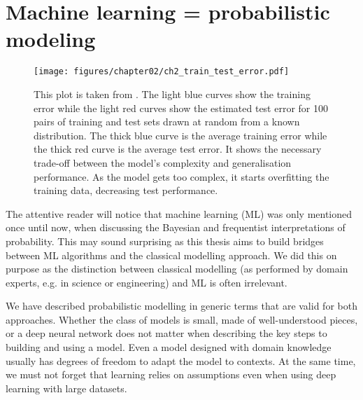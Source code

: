 \section{Machine learning = probabilistic modeling}
\begin{figure}
  \centering
  \texttt{[image: figures/chapter02/ch2\_train\_test\_error.pdf]}
  \caption{This plot is taken from \citet{louppe2014understanding}.
  The light blue curves show the training error while the
  light red curves show the estimated test error for 100
  pairs of training and test sets drawn at random
  from a known distribution. The thick blue curve is the average
  training error while the thick red curve is the average test error.
  It shows the necessary trade-off between the model's complexity and generalisation performance. As the model gets too complex, it starts overfitting the training data, decreasing test performance.}
  \label{fig:ch02:learning_curves}
\end{figure}
The attentive reader will notice that machine learning (ML) was only mentioned once until now, when discussing the Bayesian and frequentist interpretations of probability.
This may sound surprising as this thesis aims to build bridges between ML algorithms and the classical modelling approach. We did this on purpose as the distinction between classical modelling (as performed by domain experts, e.g. in science or engineering) and ML is often irrelevant.

We have described probabilistic modelling in generic terms that are valid for both approaches. Whether the class of models is small, made of well-understood pieces, or a deep neural network does not matter when describing the key steps to building and using a model. Even a model designed with domain knowledge usually has degrees of freedom to adapt the model to contexts. At the same time, we must not forget that learning relies on assumptions even when using deep learning with large datasets.


